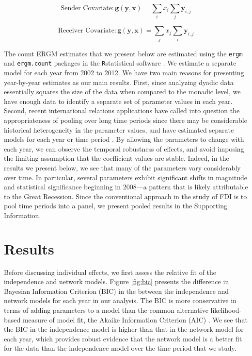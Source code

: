 \documentclass[reqno,onecolumn,letterpaper,12pt]{article}
\newcommand{\R}{\texttt{R}} %
\begin{document}
$$ \text{Sender Covariate}: \bm{g(y,x)} = \sum_{i}x_i \sum_{j} \bm{y}_{i,j}$$

$$ \text{Receiver Covariate}: \bm{g(y,x)} = \sum_{j}x_j \sum_{i} \bm{y}_{i,j}$$

\noindent The count ERGM estimates that we present below are estimated using the \texttt{ergm} \citep{ergm} and \texttt{ergm.count} \citep{ergmcount} packages in the \R \space statistical software \citep{r}. We estimate a separate model for each year from 2002 to 2012. We have two main reasons for presenting year-by-year estimates as our main results. First, since analyzing dyadic data essentially squares the size of the data when compared to the monadic level, we have enough data to identify a separate set of parameter values in each year. Second, recent international relations applications have called into question the appropriateness of pooling over long time periods since there may be considerable historical heterogeneity in the parameter values, and have estimated separate models for each year or time period  \citep[see,~e.g.,][]{cranmer2014reciprocity,cranmer2012toward,cao2014democracies,ward2007persistent}. By allowing the parameters to change with each year, we can observe the temporal robustness of effects, and avoid imposing the limiting assumption that the coefficient values are stable. Indeed, in the results we present below, we see that many of the parameters vary considerably over time. In particular, several parameters exhibit significant shifts in magnitude and statistical significance beginning in 2008---a pattern that is likely attributable to the Great Recession. %
Since the conventional approach in the study of FDI is to pool time periods into a panel, we present pooled results in the Supporting Information.


\section{Results}

Before discussing individual effects, we first assess the relative fit of the independence and network models. Figure \ref{fig:bic} presents the difference in Bayesian Information Criterion (BIC) in the between the independence and network models for each year in our analysis. The BIC is more conservative in terms of adding parameters to a model than the common alternative likelihood-based measure of model fit, the Akaike Information Criterion (AIC) \citep{waldorp2005model,raftery1999bayes}. We see that the BIC in the independence model is higher than that in the network model for each year, which provides robust evidence that the network model is a better fit for the data than the independence model over the time period that we study.
\end{document}

